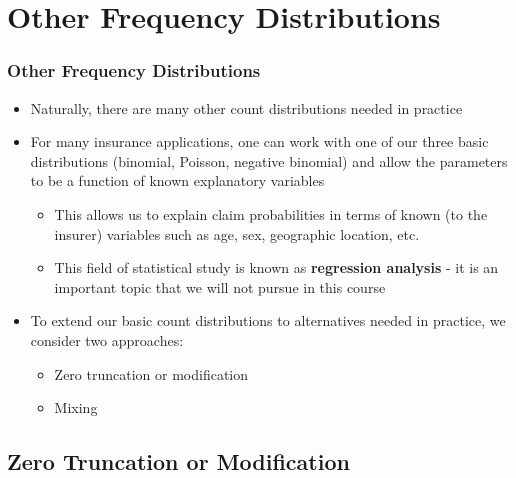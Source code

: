 \documentclass{beamer}
\begin{document}
\section{Other Frequency Distributions}

 \begin{frame}%
 \frametitle{Other Frequency Distributions}
\begin{itemize}
\item Naturally, there are many other count distributions needed in
practice \vspace{2mm}
\item For many insurance applications, one can work with one of our three basic distributions (binomial, Poisson, negative binomial) and allow the parameters to be a function of known explanatory
variables \vspace{2mm}
\begin{itemize}
\item This allows us to explain claim probabilities in terms of known (to the insurer) variables such as age, sex, geographic
location, etc.
\item This field of statistical study is known as \textbf{regression analysis} - it is an important topic that we will not pursue in this
course \vspace{2mm}
 \end{itemize}
\item To extend our basic count distributions to alternatives needed in practice, we consider two approaches:
\begin{itemize}
\item Zero truncation or modification
\item Mixing
 \end{itemize}
\end{itemize}
\end{frame}

\subsection{Zero Truncation or Modification}
\end{document}
